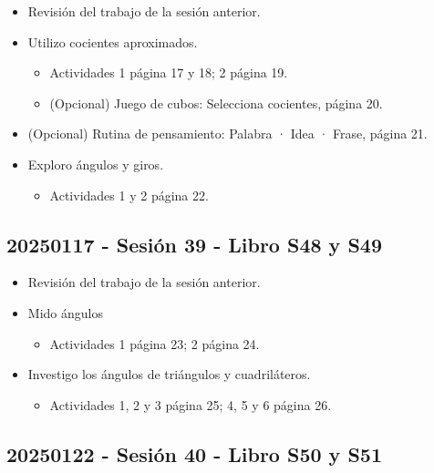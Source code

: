\documentclass[a4paper,12pt]{article}
\begin{document}
\begin{itemize}
    \item Revisión del trabajo de la sesión anterior.
    \item Utilizo cocientes aproximados.
    \begin{itemize}
        \item Actividades 1 página 17 y 18; 2 página 19.
        \item (Opcional) Juego de cubos: Selecciona cocientes, página 20.
    \end{itemize}
    \item (Opcional) Rutina de pensamiento: Palabra · Idea · Frase, página 21.
    \item Exploro ángulos y giros.
    \begin{itemize}
        \item Actividades 1 y 2 página 22.
    \end{itemize}
\end{itemize}

\subsection{20250117 - Sesión 39 - Libro S48 y S49}

\begin{itemize}
    \item Revisión del trabajo de la sesión anterior.
    \item Mido ángulos
    \begin{itemize}
        \item Actividades 1 página 23; 2 página 24.
    \end{itemize}
    \item Investigo los ángulos de triángulos y cuadriláteros.
    \begin{itemize}
        \item Actividades 1, 2 y 3 página 25; 4, 5 y 6 página 26.
    \end{itemize}
\end{itemize}

\subsection{20250122 - Sesión 40 - Libro S50 y S51}
\end{document}
